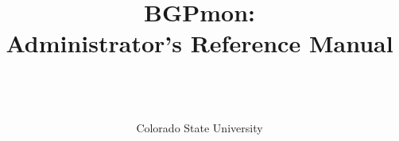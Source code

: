 \documentclass{article}
\begin{document}
\title{BGPmon: \\  Administrator's Reference Manual}
\author{\\ \\ \\ Colorado State University}
\maketitle

\pagebreak

\tableofcontents

\pagebreak

\listoffigures
\listoftables

\pagebreak




%
%
%
%
%
\appendix







\end{document}
